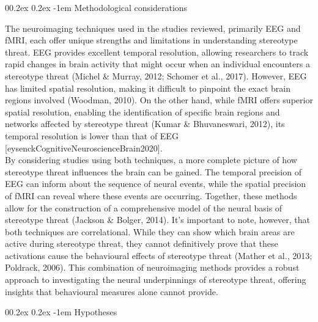 \documentclass[
  stu, a4paper, 12pt,mask,floatsintext]{apa7}
\makeatletter
\let\oldparagraph\paragraph
\renewcommand{\paragraph}[1]{\oldparagraph{#1}\mbox{}}
\renewcommand{\paragraph}{\@startsection{paragraph}{4}{\parindent}%
  {0\baselineskip \@plus 0.2ex \@minus 0.2ex}%
  {-1em}%
  {\normalfont\normalsize\bfseries\itshape\typesectitle}}
\renewcommand{\paragraph}{\@startsection{paragraph}{4}{\parindent}%
  {0\baselineskip \@plus 0.2ex \@minus 0.2ex}%
  {-1em}%
  {\normalfont\normalsize\bfseries\typesectitle}}
\makeatother
\begin{document}
\paragraph{Methodological considerations}\label{methodological-considerations}

The neuroimaging techniques used in the studies reviewed, primarily EEG and fMRI, each offer unique strengths and limitations in understanding stereotype threat.
EEG provides excellent temporal resolution, allowing researchers to track rapid changes in brain activity that might occur when an individual encounters a stereotype threat (Michel \& Murray, 2012; Schomer et al., 2017).
However, EEG has limited spatial resolution, making it difficult to pinpoint the exact brain regions involved (Woodman, 2010).
On the other hand, while fMRI offers superior spatial resolution, enabling the identification of specific brain regions and networks affected by stereotype threat (Kumar \& Bhuvaneswari, 2012), its temporal resolution is lower than that of EEG {[}eysenckCognitiveNeuroscienceBrain2020{]}.\\
By considering studies using both techniques, a more complete picture of how stereotype threat influences the brain can be gained. The temporal precision of EEG can inform about the sequence of neural events, while the spatial precision of fMRI can reveal where these events are occurring. Together, these methods allow for the construction of a comprehensive model of the neural basis of stereotype threat (Jackson \& Bolger, 2014).
It's important to note, however, that both techniques are correlational.
While they can show which brain areas are active during stereotype threat, they cannot definitively prove that these activations cause the behavioural effects of stereotype threat (Mather et al., 2013; Poldrack, 2006).
This combination of neuroimaging methods provides a robust approach to investigating the neural underpinnings of stereotype threat, offering insights that behavioural measures alone cannot provide.

\paragraph{Hypotheses}\label{hypotheses}
\end{document}
